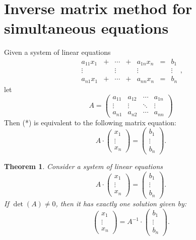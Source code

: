 \documentclass[
  english,
  12pt,
  oneside]{book}
\newtheorem{theorem}{Theorem}[chapter]
\theoremstyle{definition}
\theoremstyle{definition}
\theoremstyle{definition}
\theoremstyle{definition}
\theoremstyle{remark}
\begin{document}
\section{Inverse matrix method for simultaneous equations}\label{inverse-matrix-method-for-simultaneous-equations}

Given a system of linear equations
\begin{equation}
    \begin{matrix}
    a_{11}x_1 & + & \cdots & + & a_{1n}x_n & = &  b_1\\
    \vdots &   & \vdots &  & \vdots &  & \vdots\\
    a_{n1}x_1 & + & \cdots & + & a_{nn}x_n & = & b_n
\end{matrix},\tag{\(\ast\)}
\end{equation}
let
\[A =
\begin{pmatrix}
    a_{11} & a_{12} & \cdots & a_{1n}\\
    \vdots & \vdots & \ddots & \vdots\\
    a_{n1} & a_{n2} & \cdots & a_{nn}
\end{pmatrix}\]
Then (*) is equivalent to the following matrix equation:
\[A\cdot
\begin{pmatrix}x_1\\\vdots\\ x_n\end{pmatrix}
=
\begin{pmatrix}b_1\\\vdots\\ b_n\end{pmatrix}.\]

\begin{theorem}
Consider a system of linear equations
\[A\cdot
\begin{pmatrix}x_1\\\vdots\\ x_n\end{pmatrix}
=
\begin{pmatrix}b_1\\\vdots\\ b_n\end{pmatrix}.\]
If \(\det(A)\not=0\), then it has exactly one solution given by:
\[\begin{pmatrix}x_1\\\vdots\\ x_n\end{pmatrix}
=
A^{-1}\cdot
\begin{pmatrix}b_1\\\vdots\\ b_n\end{pmatrix}.\]
\end{theorem}
\end{document}
